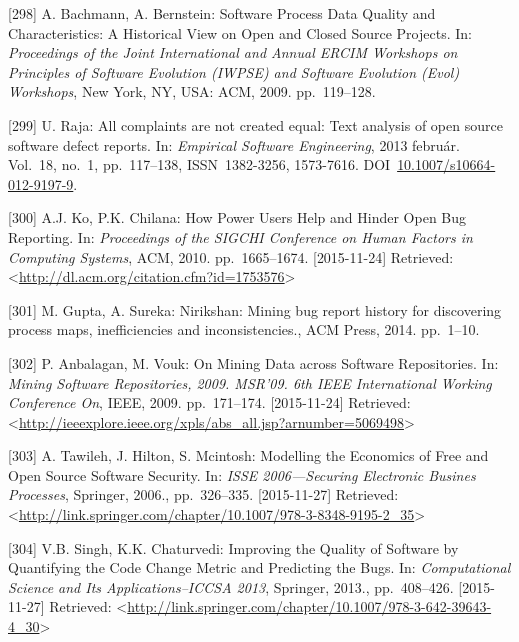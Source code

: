 \documentclass[12pt,magyar,a4paper,oneside]{scrreprt}
\newenvironment{cslreferences}%
  {}%
  {\par}
\begin{document}
\begin{cslreferences}
\leavevmode\hypertarget{ref-bachmann_software_2009}{}%
{[}298{]} A. Bachmann, A. Bernstein: Software Process Data Quality and
Characteristics: A Historical View on Open and Closed Source Projects.
In: \emph{Proceedings of the Joint International and Annual ERCIM
Workshops on Principles of Software Evolution (IWPSE) and Software
Evolution (Evol) Workshops}, New York, NY, USA: ACM, 2009. pp.~119--128.

\leavevmode\hypertarget{ref-raja_all_2013}{}%
{[}299{]} U. Raja: All complaints are not created equal: Text analysis
of open source software defect reports. In: \emph{Empirical Software
Engineering}, 2013 február. Vol.~18, no.~1, pp.~117--138,
ISSN~1382-3256, 1573-7616.
DOI~\href{https://doi.org/10.1007/s10664-012-9197-9}{10.1007/s10664-012-9197-9}.

\leavevmode\hypertarget{ref-ko_how_2010}{}%
{[}300{]} A.J. Ko, P.K. Chilana: How Power Users Help and Hinder Open
Bug Reporting. In: \emph{Proceedings of the SIGCHI Conference on Human
Factors in Computing Systems}, ACM, 2010. pp.~1665--1674.
{[}2015-11-24{]} Retrieved:
\textless{}\url{http://dl.acm.org/citation.cfm?id=1753576}\textgreater{}

\leavevmode\hypertarget{ref-gupta_nirikshan_2014}{}%
{[}301{]} M. Gupta, A. Sureka: Nirikshan: Mining bug report history for
discovering process maps, inefficiencies and inconsistencies., ACM
Press, 2014. pp.~1--10.

\leavevmode\hypertarget{ref-anbalagan_mining_2009}{}%
{[}302{]} P. Anbalagan, M. Vouk: On Mining Data across Software
Repositories. In: \emph{Mining Software Repositories, 2009. MSR'09. 6th
IEEE International Working Conference On}, IEEE, 2009. pp.~171--174.
{[}2015-11-24{]} Retrieved:
\textless{}\url{http://ieeexplore.ieee.org/xpls/abs_all.jsp?arnumber=5069498}\textgreater{}

\leavevmode\hypertarget{ref-tawileh_modelling_2006}{}%
{[}303{]} A. Tawileh, J. Hilton, S. Mcintosh: Modelling the Economics of
Free and Open Source Software Security. In: \emph{ISSE 2006---Securing
Electronic Busines Processes}, Springer, 2006., pp.~326--335.
{[}2015-11-27{]} Retrieved:
\textless{}\url{http://link.springer.com/chapter/10.1007/978-3-8348-9195-2_35}\textgreater{}

\leavevmode\hypertarget{ref-singh_improving_2013}{}%
{[}304{]} V.B. Singh, K.K. Chaturvedi: Improving the Quality of Software
by Quantifying the Code Change Metric and Predicting the Bugs. In:
\emph{Computational Science and Its Applications--ICCSA 2013}, Springer,
2013., pp.~408--426. {[}2015-11-27{]} Retrieved:
\textless{}\url{http://link.springer.com/chapter/10.1007/978-3-642-39643-4_30}\textgreater{}


\end{cslreferences}
\end{document}
